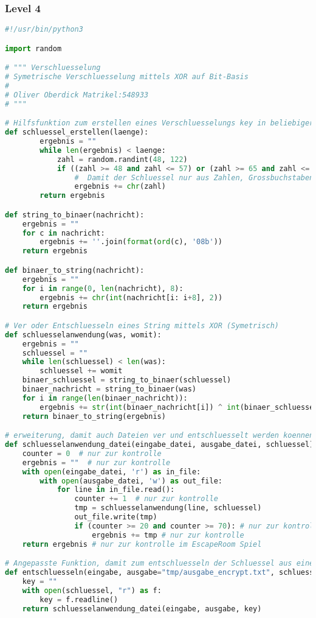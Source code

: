 \documentclass[a4paper 11pt]{article}
\begin{document}
\subsubsection{Level 4}
\begin{lstlisting}[language=python, caption=Funktionalitäten für Level 4]
#!/usr/bin/python3

import random

# """ Verschluesselung 
# Symetrische Verschluesselung mittels XOR auf Bit-Basis
#
# Oliver Oberdick Matrikel:548933
# """

# Hilfsfunktion zum erstellen eines Verschluesselungs key in beliebiger laenge
def schluessel_erstellen(laenge):
        ergebnis = ""
        while len(ergebnis) < laenge:
            zahl = random.randint(48, 122)
            if ((zahl >= 48 and zahl <= 57) or (zahl >= 65 and zahl <= 90) or (zahl >= 97 and zahl <= 122)):
				#  Damit der Schluessel nur aus Zahlen, Grossbuchstaben und Kleinbuchstaben besteht
                ergebnis += chr(zahl)
        return ergebnis

def string_to_binaer(nachricht):
	ergebnis = ""
	for c in nachricht:
		ergebnis += ''.join(format(ord(c), '08b'))
	return ergebnis

def binaer_to_string(nachricht):
	ergebnis = ""
	for i in range(0, len(nachricht), 8):
		ergebnis += chr(int(nachricht[i: i+8], 2))
	return ergebnis

# Ver oder Entschluesseln eines String mittels XOR (Symetrisch)
def schluesselanwendung(was, womit):
	ergebnis = ""
	schluessel = ""
	while len(schluessel) < len(was):
		schluessel += womit
	binaer_schluessel = string_to_binaer(schluessel)
	binaer_nachricht = string_to_binaer(was)
	for i in range(len(binaer_nachricht)):
		ergebnis += str(int(binaer_nachricht[i]) ^ int(binaer_schluessel[i]))
	return binaer_to_string(ergebnis)

# erweiterung, damit auch Dateien ver und entschluesselt werden koennen
def schluesselanwendung_datei(eingabe_datei, ausgabe_datei, schluessel):
	counter = 0  # nur zur kontrolle
	ergebnis = ""  # nur zur kontrolle
	with open(eingabe_datei, 'r') as in_file:
		with open(ausgabe_datei, 'w') as out_file:
			for line in in_file.read():
				counter += 1  # nur zur kontrolle
				tmp = schluesselanwendung(line, schluessel)
				out_file.write(tmp)
				if (counter >= 20 and counter >= 70): # nur zur kontrolle
					ergebnis += tmp # nur zur kontrolle
	return ergebnis # nur zur kontrolle im EscapeRoom Spiel

# Angepasste Funktion, damit zum entschluesseln der Schluessel aus einer Daten genutzt werden kann
def entschluesseln(eingabe, ausgabe="tmp/ausgabe_encrypt.txt", schluessel="tmp/game.key"):
	key = ""
	with open(schluessel, "r") as f:
		key = f.readline()
	return schluesselanwendung_datei(eingabe, ausgabe, key)


\end{lstlisting}
\end{document}
